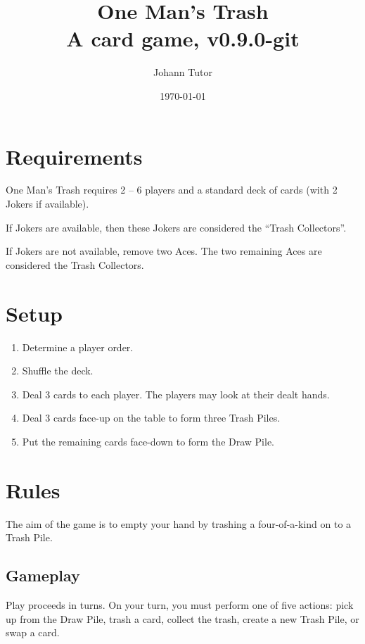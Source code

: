 \documentclass{article}
\newcommand\theversion{0.9.0-git}
\newcommand\thegame{One Man's Trash}
\begin{document}
\title{\thegame{}\\ \large A card game, v\theversion}
\author{Johann Tutor}
\date{\today}
\maketitle

\tableofcontents

\newpage

\section{Requirements}
\label{sec:requirements}

\thegame{} requires 2 -- 6 players and a standard deck of cards (with 2 Jokers if available).

If Jokers are available, then these Jokers are considered the ``Trash Collectors''.

If Jokers are not available, remove two Aces.
The two remaining Aces are considered the Trash Collectors.

\section{Setup}
\label{sec:setup}

\begin{enumerate}
  \item Determine a player order.
  \item Shuffle the deck.
  \item Deal 3 cards to each player. The players may look at their dealt hands.
  \item Deal 3 cards face-up on the table to form three Trash Piles.
  \item Put the remaining cards face-down to form the Draw Pile.
\end{enumerate}

\section{Rules}
\label{sec:rules}

The aim of the game is to empty your hand by trashing a four-of-a-kind on to a Trash Pile.

\subsection{Gameplay}
\label{sec:gameplay}

Play proceeds in turns. On your turn, you must perform one of five actions: pick up from the Draw Pile, trash a card, collect the trash, create a new Trash Pile, or swap a card.
\end{document}
